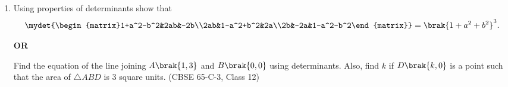 \begin{enumerate}[label=\thesubsection.\arabic*., ref=\thesubsection.\theenumi]
\solution
The two vectors are
\begin{align}
\vec{p} = \vec{a}+\vec{b} = \myvec{2\\3\\4},\qquad
\vec{q} = \vec{a}-\vec{b} = \myvec{0\\-1\\-2}
\end{align}
A vector $\vec{n}$ perpendicular to both satisfies \eqref{eq:c12-dot},
\begin{align}
\myvec{\vec{p}^{\top}\\\vec{q}^{\top}}\vec{n} = \myvec{2&3&4\\0&-1&-2}\vec{n}=\vec{0}
\end{align}
The second row gives $n_2=-2n_3$ and the first row gives $2n_1=-3n_2-4n_3=2n_3$, so $n_1=n_3$. Taking $n_3=-1$,
\begin{align}
\vec{n} = \myvec{-1\\2\\-1},\qquad \norm{\vec{n}}^2 = 1+4+1 = 6
\end{align}
Dividing by the norm, the unit vectors perpendicular to both $\vec{p}$ and $\vec{q}$ are
\begin{align}
\hat{\vec{n}} = \pm\frac{\vec{n}}{\norm{\vec{n}}}
= \pm\frac{1}{\sqrt{6}}\myvec{-1\\2\\-1}
\end{align}
that is, $\pm\frac{1}{\sqrt{6}}\brak{-\hat{i}+2\hat{j}-\hat{k}}$. Check: $\vec{n}^{\top}\vec{p}=-2+6-4=0$ and $\vec{n}^{\top}\vec{q}=-2+2=0$.
 
 
\begin{center}
\end{center}
 
\item Using properties of determinants show that
\begin{align*}
\mydet{\begin{matrix}1+a^2-b^2&2ab&-2b\\2ab&1-a^2+b^2&2a\\2b&-2a&1-a^2-b^2\end{matrix}} = \brak{1+a^2+b^2}^3.
\end{align*}
\begin{center}\textbf{OR}\end{center}
Find the equation of the line joining $A\brak{1,3}$ and $B\brak{0,0}$ using determinants. Also, find $k$ if $D\brak{k,0}$ is a point such that the area of $\triangle ABD$ is $3$ square units.
\hfill (CBSE 65-C-3, Class 12)
 

\end{enumerate}
